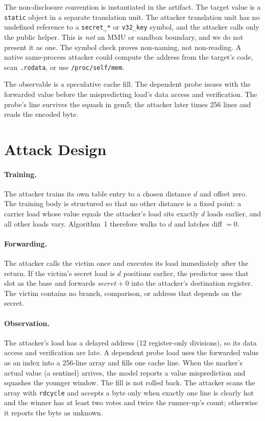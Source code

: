 \documentclass[conference]{IEEEtran}
\newcommand{\code}[1]{\texttt{\small #1}}
\begin{document}
The non-disclosure convention is instantiated in the artifact. The
target value is a \code{static} object in a separate translation unit.
The attacker translation unit has no undefined reference to a
\code{secret\_*} or \code{v32\_key} symbol, and the attacker calls only
the public helper. This is \emph{not} an MMU or sandbox boundary, and we
do not present it as one. The symbol check proves non-naming, not
non-reading. A native same-process attacker could compute the address
from the target's code, scan \code{.rodata}, or use
\code{/proc/self/mem}.

The observable is a speculative cache fill. The dependent probe issues
with the forwarded value before the mispredicting load's data access and
verification. The probe's line survives the squash in gem5; the attacker
later times 256 lines and reads the encoded byte.

\section{Attack Design}

\paragraph{Training.}
The attacker trains its own table entry to a chosen distance $d$ and
offset zero. The training body is structured so that no other distance
is a fixed point: a carrier load whose value equals the attacker's load
sits exactly $d$ loads earlier, and all other loads vary. Algorithm~1
therefore walks to $d$ and latches diff $=0$.

\paragraph{Forwarding.}
The attacker calls the victim once and executes its load immediately
after the return. If the victim's secret load is $d$ positions earlier,
the predictor uses that slot as the base and forwards
$\mathit{secret}+0$ into the attacker's destination register. The victim
contains no branch, comparison, or address that depends on the secret.

\paragraph{Observation.}
The attacker's load has a delayed address (12 register-only divisions),
so its data access and verification are late. A dependent probe load uses
the forwarded value as an index into a 256-line array and fills one cache
line. When the marker's actual value (a sentinel) arrives, the model
reports a value misprediction and squashes the younger window. The fill
is not rolled back. The attacker scans the array with \code{rdcycle} and
accepts a byte only when exactly one line is clearly hot and the winner
has at least two votes and twice the runner-up's count; otherwise it
reports the byte as unknown.
\end{document}
